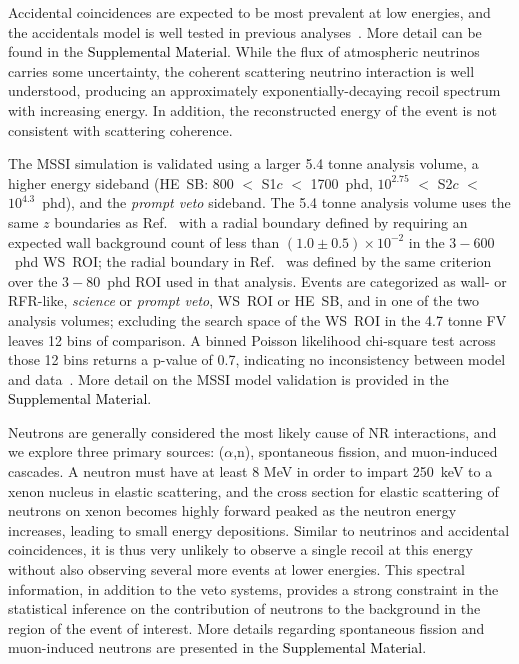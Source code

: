 Accidental coincidences are expected to be most prevalent at low energies,
and the accidentals model is well tested in previous analyses~\cite{LZ:SR3_WS2024, LZ:2025lowmass}. More detail can be found in the \textcolor{black}{Supplemental Material}.
While the flux of atmospheric neutrinos carries some uncertainty, the coherent scattering neutrino interaction is well understood, producing an approximately exponentially-decaying recoil spectrum with increasing energy.
In addition, the reconstructed energy of the event is not consistent with scattering coherence.

The MSSI simulation is validated using a larger 5.4 tonne analysis volume, a higher energy sideband (HE~SB: 800 $<$ S1$c$ $<$ 1700~phd, $10^{2.75}$ $<$ S2$c$ $<$ $10^{4.3}$~phd), and the \emph{prompt veto} sideband. The 5.4 tonne analysis volume uses the same $z$ boundaries as Ref.~\cite{LZ:SR3_WS2024} with a radial boundary defined by requiring an expected wall background count of less than $(1.0 \pm 0.5)\times10^{-2}$ in the $3-600$~phd WS~ROI; the radial boundary in Ref.~\cite{LZ:SR3_WS2024} was defined by the same criterion over the $3-80$~phd ROI used in that analysis. 
Events are categorized as wall- or RFR-like, \emph{science} or \emph{prompt veto}, WS~ROI or HE~SB, and in one of the two analysis volumes; excluding the search space of the WS~ROI in the 4.7 tonne FV leaves 12 bins of comparison. 
A binned Poisson likelihood chi-square test across those 12 bins returns a p-value of 0.7, indicating no inconsistency between model and data~\cite{BAKER1984437}.
More detail on the MSSI model validation is provided in the \textcolor{black}{Supplemental Material}.

Neutrons are generally considered the most likely cause of NR interactions, and we explore three primary sources: ($\alpha$,n), spontaneous fission, and muon-induced cascades. 
A neutron must have at least 8 MeV in order to impart 250~keV to a xenon nucleus in elastic scattering, and the cross section for elastic scattering of neutrons on xenon becomes highly forward peaked as the neutron energy increases, leading to small energy depositions. 
Similar to neutrinos and accidental coincidences, it is thus very unlikely to observe a single  recoil at this energy without also observing several more events at lower energies.
This spectral information, in addition to the veto systems, provides a strong constraint in the statistical inference on the contribution of neutrons to the background in the region of the event of interest. 
More details regarding 
spontaneous fission and muon-induced 
neutrons are presented in the \textcolor{black}{Supplemental Material}.

